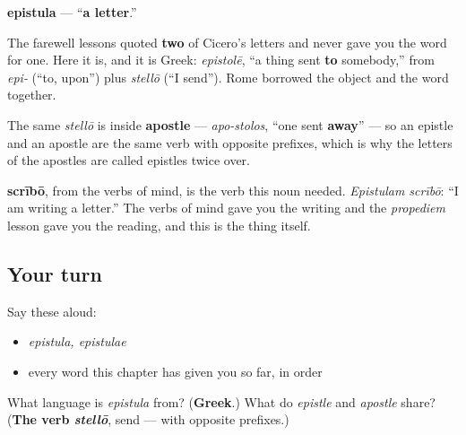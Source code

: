\begin{cousinweb}
\textbf{epistula} — \textquotedblleft{}\textbf{a letter}.\textquotedblright{}

The farewell lessons quoted \textbf{two} of Cicero's letters and never gave you the word for one. Here it is, and it is Greek: \emph{epistolē}, \textquotedblleft{}a thing sent \textbf{to} somebody,\textquotedblright{} from \emph{epi-} (\textquotedblleft{}to, upon\textquotedblright{}) plus \emph{stellō} (\textquotedblleft{}I send\textquotedblright{}). Rome borrowed the object and the word together.

The same \emph{stellō} is inside \textbf{apostle} — \emph{apo-stolos}, \textquotedblleft{}one sent \textbf{away}\textquotedblright{} — so an epistle and an apostle are the same verb with opposite prefixes, which is why the letters of the apostles are called epistles twice over.

\textbf{scrībō}, from the verbs of mind, is the verb this noun needed. \emph{Epistulam scrībō}: \textquotedblleft{}I am writing a letter.\textquotedblright{} The verbs of mind gave you the writing and the \emph{propediem} lesson gave you the reading, and this is the thing itself.
\end{cousinweb}

\subsection*{Your turn}
Say these aloud:

\begin{itemize}
\raggedright
  \item \emph{epistula, epistulae}
  \item every word this chapter has given you so far, in order
\end{itemize}

\begin{tcolorbox}[breakable,colback=teal!4,colframe=teal!35!black,title={Before you move on}]
What language is \emph{epistula} from? (\textbf{Greek}.) What do \emph{epistle} and \emph{apostle} share? (\textbf{The verb \emph{stellō}}, send — with opposite prefixes.)
\end{tcolorbox}
